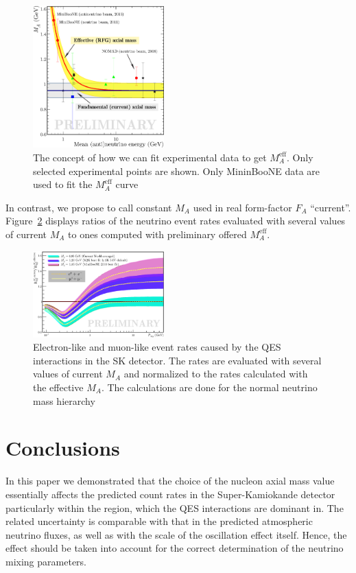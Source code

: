 \documentclass[preprint]{elsarticle}
\begin{document}
\begin{figure}[h!]
\begin{center}
\includegraphics[width=0.45\textwidth]{./QES/MA_QES_Effective-2.eps}
\caption{\label{MA_QES_Effective}The concept of how we can fit experimental data to get $M_{A}^{\mathrm{eff}}$. Only selected experimental points are shown. Only MininBooNE data are used to fit the $M_{A}^{\mathrm{eff}}$ curve}
\end{center}
\end{figure}

In contrast, we propose to call constant $M_A$ used in real form-factor $F_A$ ``current''. Figure~\ref{EventRates} displays ratios of the neutrino event rates evaluated with several values of current $M_A$ to ones computed with preliminary offered $M_{A}^{\mathrm{eff}}$.

\begin{figure}[h!]
\begin{center}
\includegraphics[width=0.45\textwidth]{./SK/cvsv2lmn_all2.eps}
\caption{\label{EventRates}Electron-like and muon-like event rates caused by the QES interactions in the SK detector. The rates are evaluated with several values of current $M_A$ and normalized to the rates calculated with the effective $M_A$. The calculations are done for the normal neutrino mass hierarchy}
\end{center}
\end{figure}

\section{Conclusions}
In this paper we demonstrated that the choice of the nucleon axial mass value essentially affects the predicted count rates in the Super-Kamiokande detector particularly within the region, which the QES interactions are dominant in. The related uncertainty is comparable with that in the predicted atmospheric neutrino fluxes, as well as with the scale of the oscillation effect itself. Hence, the effect should be taken into account for the correct determination of the neutrino mixing parameters. 
\end{document}

